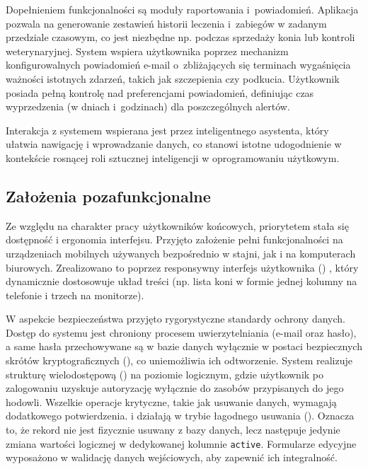 Dopełnieniem funkcjonalności są moduły raportowania i~powiadomień. Aplikacja pozwala na generowanie zestawień historii leczenia i~zabiegów w zadanym przedziale czasowym, co jest niezbędne np. podczas sprzedaży konia lub kontroli weterynaryjnej. System wspiera użytkownika poprzez mechanizm konfigurowalnych powiadomień e-mail o~zbliżających się terminach wygaśnięcia ważności istotnych zdarzeń, takich jak szczepienia czy podkucia. Użytkownik posiada pełną kontrolę nad preferencjami powiadomień, definiując czas wyprzedzenia (w dniach i~godzinach) dla poszczególnych alertów.

Interakcja z systemem wspierana jest przez inteligentnego asystenta, który ułatwia nawigację i wprowadzanie danych, co stanowi istotne udogodnienie w kontekście rosnącej roli sztucznej inteligencji w oprogramowaniu użytkowym.

\subsection{Założenia pozafunkcjonalne} \label{sec:pozafunkcjonalne}

Ze względu na charakter pracy użytkowników końcowych, priorytetem stała się dostępność i ergonomia interfejsu. Przyjęto założenie pełni funkcjonalności na urządzeniach mobilnych używanych bezpośrednio w stajni, jak i na komputerach biurowych. Zrealizowano to poprzez responsywny interfejs użytkownika () \cite{mdn_rwd}, który dynamicznie dostosowuje układ treści (np. lista koni w formie jednej kolumny na telefonie i trzech na monitorze).

W aspekcie bezpieczeństwa przyjęto rygorystyczne standardy ochrony danych. Dostęp do systemu jest chroniony procesem uwierzytelniania (e-mail oraz hasło), a same hasła przechowywane są w bazie danych wyłącznie w postaci bezpiecznych skrótów kryptograficznych (), co uniemożliwia ich odtworzenie. System realizuje strukturę wielodostępową () na poziomie logicznym, gdzie użytkownik po zalogowaniu uzyskuje autoryzację wyłącznie do zasobów przypisanych do jego hodowli. Wszelkie operacje krytyczne, takie jak usuwanie danych, wymagają dodatkowego potwierdzenia. i działają w trybie łagodnego usuwania (). Oznacza to, że rekord nie jest fizycznie usuwany z bazy danych, lecz następuje jedynie zmiana wartości logicznej w dedykowanej kolumnie \texttt{active}. Formularze edycyjne wyposażono w walidację danych wejściowych, aby zapewnić ich integralność.

